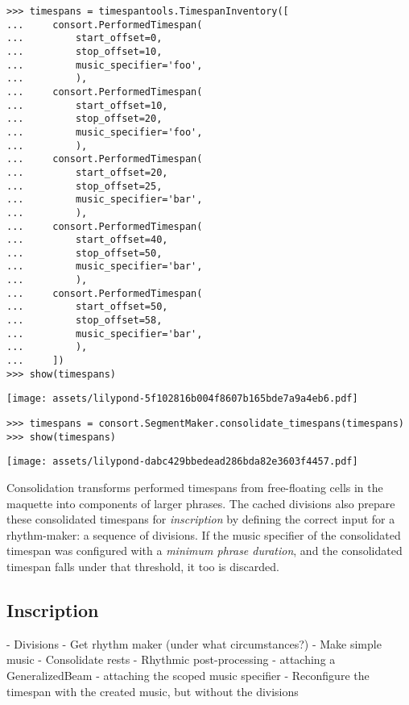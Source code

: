 \begin{abjadbookoutput}
\begin{singlespacing}
\vspace{-0.5\baselineskip}
\begin{lstlisting}
>>> timespans = timespantools.TimespanInventory([
...     consort.PerformedTimespan(
...         start_offset=0,
...         stop_offset=10,
...         music_specifier='foo',
...         ),
...     consort.PerformedTimespan(
...         start_offset=10,
...         stop_offset=20,
...         music_specifier='foo',
...         ),
...     consort.PerformedTimespan(
...         start_offset=20,
...         stop_offset=25,
...         music_specifier='bar',
...         ),
...     consort.PerformedTimespan(
...         start_offset=40,
...         stop_offset=50,
...         music_specifier='bar',
...         ),
...     consort.PerformedTimespan(
...         start_offset=50,
...         stop_offset=58,
...         music_specifier='bar',
...         ),
...     ])
>>> show(timespans)
\end{lstlisting}
\noindent\texttt{[image: assets/lilypond-5f102816b004f8607b165bde7a9a4eb6.pdf]}
\begin{lstlisting}
>>> timespans = consort.SegmentMaker.consolidate_timespans(timespans)
>>> show(timespans)
\end{lstlisting}
\noindent\texttt{[image: assets/lilypond-dabc429bbedead286bda82e3603f4457.pdf]}
\end{singlespacing}
\end{abjadbookoutput}

\noindent Consolidation transforms performed timespans from free-floating cells
in the maquette into components of larger phrases. The cached divisions also
prepare these consolidated timespans for \emph{inscription} by defining the
correct input for a rhythm-maker: a sequence of divisions. If the music
specifier of the consolidated timespan was configured with a \emph{minimum
phrase duration}, and the consolidated timespan falls under that threshold, it
too is discarded.

\subsection{Inscription}
\label{ssec:inscription}

\begin{markdown}
-   Divisions
-   Get rhythm maker (under what circumstances?)
-   Make simple music
-   Consolidate rests
-   Rhythmic post-processing
    -   attaching a GeneralizedBeam
    -   attaching the scoped music specifier
-   Reconfigure the timespan with the created music, but without the divisions
\end{markdown}

